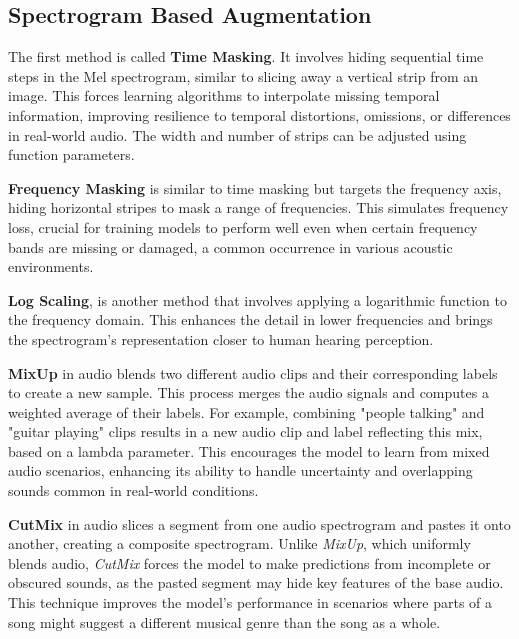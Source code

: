 \subsection{Spectrogram Based Augmentation}

The first method is called \textbf{Time Masking}. It involves hiding sequential time steps in the Mel spectrogram, similar to slicing away a vertical strip from an image. This forces learning algorithms to interpolate missing temporal information, improving resilience to temporal distortions, omissions, or differences in real-world audio. The width and number of strips can be adjusted using function parameters.

\textbf{Frequency Masking} is similar to time masking but targets the frequency axis, hiding horizontal stripes to mask a range of frequencies. This simulates frequency loss, crucial for training models to perform well even when certain frequency bands are missing or damaged, a common occurrence in various acoustic environments.


\textbf{Log Scaling}, is another method that involves applying a logarithmic function to the frequency domain. This enhances the detail in lower frequencies and brings the spectrogram's representation closer to human hearing perception.

\textbf{MixUp} in audio blends two different audio clips and their corresponding labels to create a new sample. This process merges the audio signals and computes a weighted average of their labels. For example, combining "people talking" and "guitar playing" clips results in a new audio clip and label reflecting this mix, based on a lambda parameter. This encourages the model to learn from mixed audio scenarios, enhancing its ability to handle uncertainty and overlapping sounds common in real-world conditions.

\textbf{CutMix} in audio slices a segment from one audio spectrogram and pastes it onto another, creating a composite spectrogram. Unlike \textit{MixUp}, which uniformly blends audio, \textit{CutMix} forces the model to make predictions from incomplete or obscured sounds, as the pasted segment may hide key features of the base audio. This technique improves the model's performance in scenarios where parts of a song might suggest a different musical genre than the song as a whole.

